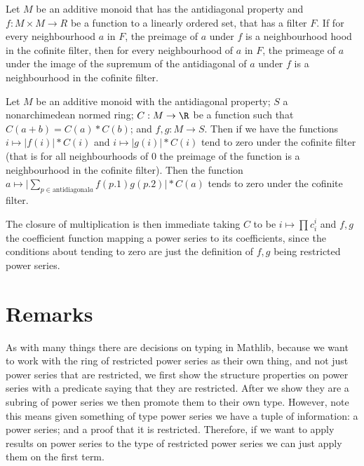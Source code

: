 \begin{lemma}
  Let $M$ be an additive monoid that has the antidiagonal property and $f : M \times M \to R$ be
  a function to a linearly ordered set, that has a filter $F$. If for every neighbourhood
  $a$ in $F$, the preimage of $a$ under $f$ is a neighbourhood hood in the cofinite filter,
  then for every neighbourhood of $a$ in $F$, the primeage of $a$ under the image of the supremum of the
  antidiagonal of $a$ under $f$ is a neighbourhood in the cofinite filter.
\end{lemma}

\begin{lemma}
  Let $M$ be an additive monoid with the antidiagonal property; $S$ a nonarchimedean normed
  ring; $C : M \to \R$ be a function such that $C (a + b) = C (a) * C (b)$; and $f, g : M \to S$.
  Then if we have the functions $i \mapsto \lvert f(i)  \rvert * C(i)$ and
  $i \mapsto \lvert g(i) \rvert * C(i)$ tend to zero under the cofinite filter (that is for all
  neighbourhoods of 0 the preimage of the function is a neighbourhood in the cofinite filter). Then
  the function $a \mapsto \lvert \sum_{p \in \text{antidiagonal} a} f (p.1) g (p.2) \rvert * C (a)$
  tends to zero under the cofinite filter.
\end{lemma}

The closure of multiplication is then immediate taking $C$ to be $i \mapsto \prod c_i^i$ and $f, g$
the coefficient function mapping a power series to its coefficients, since the conditions about tending
to zero are just the definition of $f,g$ being restricted power series.

\section{Remarks}

As with many things there are decisions on typing in Mathlib, because we want to work with the ring
of restricted power series as their own thing, and not just power series that are restricted, we
first show the structure properties on power series with a predicate saying that they are restricted.
After we show they are a subring of power series we then promote them to their own type. However,
note this means given something of type power series we have a tuple of information: a power series;
and a proof that it is restricted. Therefore, if we want to apply results on power series to the
type of restricted power series we can just apply them on the first term.
